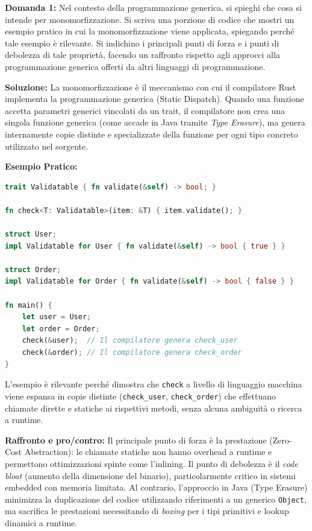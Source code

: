 \begin{exambox}
\textbf{Domanda 1:} Nel contesto della programmazione generica, si spieghi che cosa si intende per monomorfizzazione.
Si scriva una porzione di codice che mostri un esempio pratico in cui la monomorfizzazione viene applicata, spiegando perché tale esempio è rilevante.
Si indichino i principali punti di forza e i punti di debolezza di tale proprietà, facendo un raffronto rispetto agli approcci alla programmazione generica offerti da altri linguaggi di programmazione.

\textbf{Soluzione:}
La monomorfizzazione è il meccanismo con cui il compilatore Rust implementa la programmazione generica (Static Dispatch). Quando una funzione accetta parametri generici vincolati da un trait, il compilatore non crea una singola funzione generica (come accade in Java tramite \textit{Type Erasure}), ma genera internamente copie distinte e specializzate della funzione per ogni tipo concreto utilizzato nel sorgente.

\textbf{Esempio Pratico:}
\begin{lstlisting}[language=Rust]
trait Validatable { fn validate(&self) -> bool; }

fn check<T: Validatable>(item: &T) { item.validate(); }

struct User;
impl Validatable for User { fn validate(&self) -> bool { true } }

struct Order;
impl Validatable for Order { fn validate(&self) -> bool { false } }

fn main() {
    let user = User;
    let order = Order;
    check(&user);  // Il compilatore genera check_user
    check(&order); // Il compilatore genera check_order
}
\end{lstlisting}
L'esempio è rilevante perché dimostra che \texttt{check} a livello di linguaggio macchina viene espansa in copie distinte (\texttt{check\_user}, \texttt{check\_order}) che effettuano chiamate dirette e statiche ai rispettivi metodi, senza alcuna ambiguità o ricerca a runtime.

\textbf{Raffronto e pro/contro:}
Il principale punto di forza è la prestazione (Zero-Cost Abstraction): le chiamate statiche non hanno overhead a runtime e permettono ottimizzazioni spinte come l'inlining. Il punto di debolezza è il \textit{code bloat} (aumento della dimensione del binario), particolarmente critico in sistemi embedded con memoria limitata. Al contrario, l'approccio in Java (Type Erasure) minimizza la duplicazione del codice utilizzando riferimenti a un generico \texttt{Object}, ma sacrifica le prestazioni necessitando di \textit{boxing} per i tipi primitivi e lookup dinamici a runtime.
\end{exambox}

